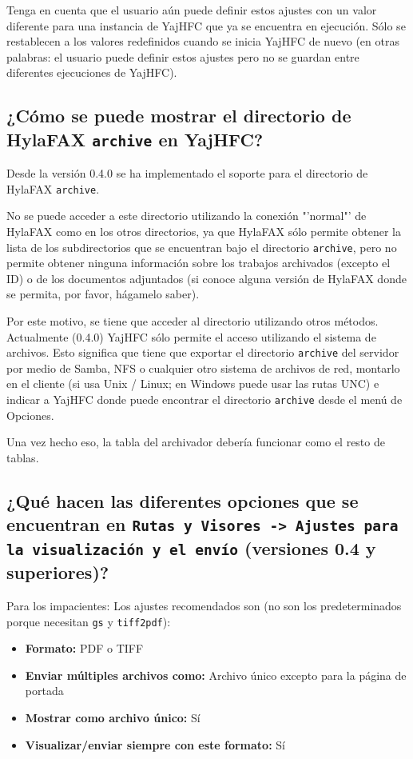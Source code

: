 \documentclass[a4paper,10pt]{scrartcl}
\begin{document}
Tenga en cuenta que el usuario aún puede definir estos ajustes con un valor diferente para una instancia de YajHFC que ya se encuentra en ejecución. Sólo se restablecen a los valores redefinidos cuando se inicia YajHFC de nuevo (en otras palabras: el usuario puede definir estos ajustes pero no se guardan entre diferentes ejecuciones de YajHFC).


\subsection{¿Cómo se puede mostrar el directorio de HylaFAX \texttt{archive} en YajHFC?}

Desde la versión 0.4.0 se ha implementado el soporte para el directorio de HylaFAX \texttt{archive}.

No se puede acceder a este directorio utilizando la conexión "'normal"' de HylaFAX como en los otros directorios, ya que HylaFAX sólo permite obtener la lista de los subdirectorios que se encuentran bajo el directorio \texttt{archive}, pero no permite obtener ninguna información sobre los trabajos archivados (excepto el ID) o de los documentos adjuntados (si conoce alguna versión de HylaFAX donde se permita, por favor, hágamelo saber).

Por este motivo, se tiene que acceder al directorio utilizando otros métodos. Actualmente (0.4.0) YajHFC sólo permite el acceso utilizando el sistema de archivos. Esto significa que tiene que exportar el directorio \texttt{archive} del servidor por medio de Samba, NFS o cualquier otro sistema de archivos de red, montarlo en el cliente (si usa Unix / Linux; en Windows puede usar las rutas UNC) e indicar a YajHFC donde puede encontrar el directorio \texttt{archive} desde el menú de Opciones.

Una vez hecho eso, la tabla del archivador debería funcionar como el resto de tablas.

\subsection{¿Qué hacen las diferentes opciones que se encuentran en \texttt{Rutas y Visores ->\ Ajustes para la visualización y el envío} (versiones 0.4 y superiores)?}

Para los impacientes: Los ajustes recomendados son (no son los predeterminados porque necesitan \texttt{gs} y \texttt{tiff2pdf}):
\begin{itemize}
 \item \textbf{Formato:} PDF o TIFF
 \item \textbf{Enviar múltiples archivos como:} Archivo único excepto para la página de portada
 \item \textbf{Mostrar como archivo único:} Sí
 \item \textbf{Visualizar/enviar siempre con este formato:} Sí
\end{itemize}
\end{document}
